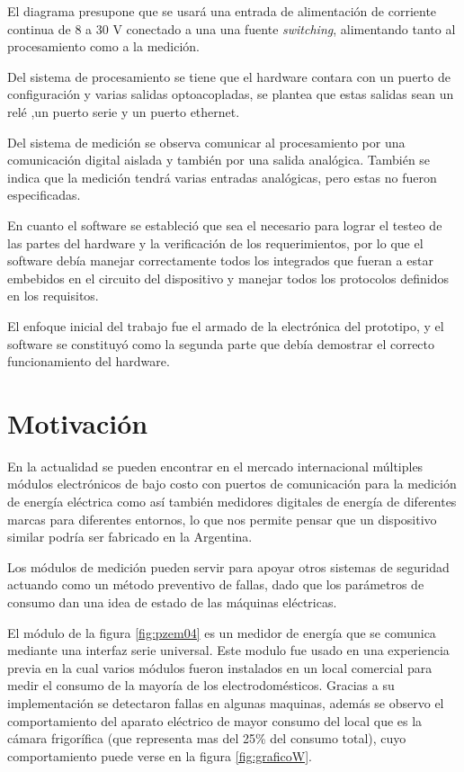 El diagrama presupone que se usará una entrada de alimentación de corriente continua de 8 a 30 V conectado a una una fuente \textit{switching}, alimentando tanto al procesamiento como a la medición.

Del sistema de procesamiento se tiene que el hardware contara con un puerto de configuración y varias salidas optoacopladas, se plantea que estas salidas sean un relé ,un puerto serie y un puerto ethernet.

Del sistema de medición se observa comunicar al procesamiento por una comunicación digital aislada y también por una salida analógica. También se indica que la medición tendrá varias entradas analógicas, pero estas no fueron especificadas.

En cuanto el software se estableció que sea el necesario para lograr el testeo de las partes del hardware y la verificación de los requerimientos, por lo que el software debía manejar correctamente todos los integrados que fueran a estar embebidos en el circuito del dispositivo y manejar todos los protocolos definidos en los requisitos.

El enfoque inicial del trabajo fue el armado de la electrónica del prototipo, y el software se constituyó como la segunda parte que debía demostrar el correcto funcionamiento del hardware.




\section{Motivación}

En la actualidad se pueden encontrar en el mercado internacional múltiples módulos electrónicos de bajo costo con puertos de comunicación para la medición de energía eléctrica como así también medidores digitales de energía de diferentes marcas para diferentes entornos, lo que nos permite pensar que un dispositivo similar podría ser fabricado en la Argentina.

Los módulos de medición pueden servir para apoyar otros sistemas de seguridad actuando como un método preventivo de fallas, dado que los parámetros de consumo dan una idea de estado de las máquinas eléctricas.  

El módulo de la figura \ref{fig:pzem04} es un medidor de energía que se comunica mediante una interfaz serie universal. Este modulo fue usado en una experiencia previa en la cual varios módulos fueron instalados en un local comercial para medir el consumo de la mayoría de los electrodomésticos. Gracias a su implementación se detectaron fallas en algunas maquinas, además se observo el comportamiento del aparato eléctrico de mayor consumo del local que es la cámara frigorífica (que representa mas del 25\% del consumo total), cuyo comportamiento puede verse en la figura \ref{fig:graficoW}.  

